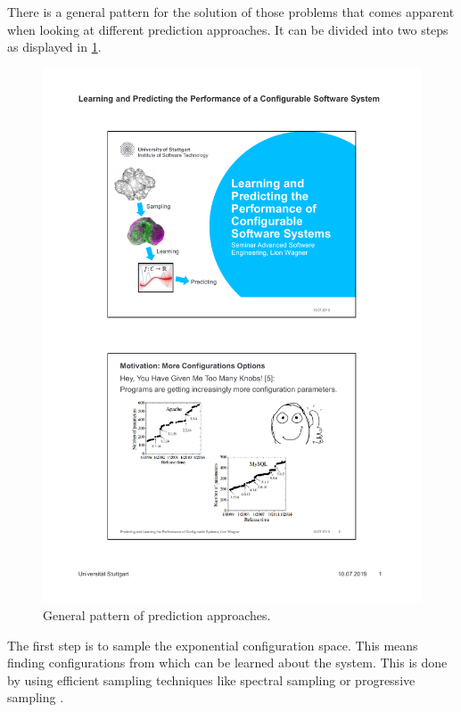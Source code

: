 \noindent
There is a general pattern for the solution of those problems that comes apparent when looking at different prediction approaches. It can be divided into two steps as displayed in \cref{fig:GeneralApproach}.\begin{figure}
	\includegraphics[page=9,clip,trim=4.1cm 5.9cm 3.9cm 19.4cm, width=\textwidth]{presentation/presentation}
	\caption{General pattern of prediction approaches. }
	\label{fig:GeneralApproach}
\end{figure}

The first step is to sample the exponential configuration space. This means finding configurations from which can be learned about the system. This is done by using efficient sampling techniques like spectral sampling \cite{DistanceBasedSampling2019} or progressive sampling \cite{CostEfficientSampling_Gou_Siegmund_2015}.

